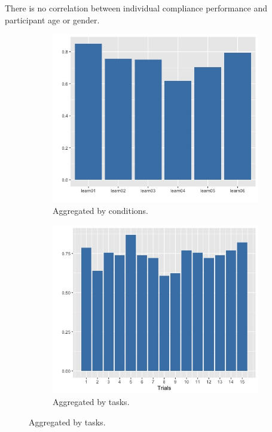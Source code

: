\documentclass{article}
\begin{document}
There is no correlation between individual compliance performance and participant age or gender.

\begin{figure}[h!]
  \centering
  \begin{subfigure}[t]{0.45\textwidth}
    \centering
    \includegraphics[width=\linewidth]{com_group} 
    \caption{Aggregated by conditions.}
  \end{subfigure}
  \begin{subfigure}[t]{0.45\textwidth}
    \centering
    \includegraphics[width=\linewidth]{com_trial} 
    \caption{Aggregated by tasks.}
  \end{subfigure}


\end{figure}
\end{document}
